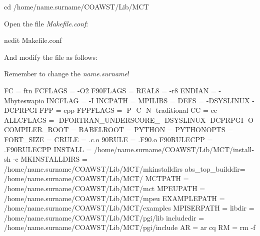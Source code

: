 \begin{bashcode}
cd /home/name.surname/COAWST/Lib/MCT
\end{bashcode}
\bigskip

\noindent Open the file \textit{Makefile.conf}:
\bigskip


\begin{bashcode}
nedit Makefile.conf
\end{bashcode}
\bigskip

\noindent And modify the file as follows:
\bigskip

\begin{tcolorbox}[enhanced,
  grow to left by=0cm,%
  grow to right by=0cm,%
  enlarge top by=0cm,%
  enlarge bottom by=0cm,%
  tcbox raise base,
  boxrule=1.0pt,
  left=18mm,
  colframe=red!50!black,coltext=red!25!black,colback=red!10!white,
  overlay={\begin{tcbclipinterior}\fill[red!75!blue!50!white] (frame.south west)
    rectangle node[text=white,font=\sffamily\bfseries\footnotesize,rotate=0] {WARNING} ([xshift=18mm]frame.north west);\end{tcbclipinterior}}]
    Remember to change the \textit{name.surname}!
\end{tcolorbox}
\bigskip

\begin{bashcode}
FC  	    = ftn
FCFLAGS	 = -O2
F90FLAGS        = 
REAL8           = -r8
ENDIAN          = -Mbyteswapio
INCFLAG         = -I
INCPATH         =
MPILIBS         = 
DEFS            = -DSYSLINUX -DCPRPGI
FPP	     = cpp
FPPFLAGS        = -P -C -N -traditional
CC              = cc
ALLCFLAGS       = -DFORTRAN_UNDERSCORE_ -DSYSLINUX -DCPRPGI -O
COMPILER_ROOT   = 
BABELROOT       = 
PYTHON          = 
PYTHONOPTS      = 
FORT_SIZE       = 
CRULE           = .c.o
90RULE          = .F90.o
F90RULECPP      = .F90RULECPP
INSTALL         = /home/name.surname/COAWST/Lib/MCT/install-sh -c
MKINSTALLDIRS   = /home/name.surname/COAWST/Lib/MCT/mkinstalldirs
abs_top_builddir= /home/name.surname/COAWST/Lib/MCT/
MCTPATH         = /home/name.surname/COAWST/Lib/MCT/mct
MPEUPATH        = /home/name.surname/COAWST/Lib/MCT/mpeu
EXAMPLEPATH     = /home/name.surname/COAWST/Lib/MCT/examples
MPISERPATH      = 
libdir          = /home/name.surname/COAWST/Lib/MCT/pgi/lib
includedir      = /home/name.surname/COAWST/Lib/MCT/pgi/include
AR	      = ar cq
RM	      = rm -f
\end{bashcode}
\bigskip

